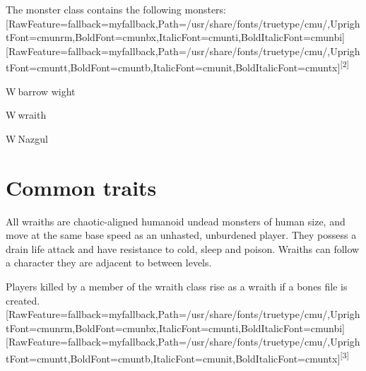 \documentclass[fontsize=11pt,paper=A4,BCOR=12mm,DIV=13,open=any,listof=totoc,toc=flat]{scrbook}
\begin{document}
The monster class contains the following monsters:\allowbreak{}\setmainfont{cmunrm.ttf}[RawFeature={fallback=myfallback},Path=/usr/share/fonts/truetype/cmu/,UprightFont=cmunrm,BoldFont=cmunbx,ItalicFont=cmunti,BoldItalicFont=cmunbi]\setmonofont{cmunrm.ttf}[RawFeature={fallback=myfallback},Path=/usr/share/fonts/truetype/cmu/,UprightFont=cmuntt,BoldFont=cmuntb,ItalicFont=cmunit,BoldItalicFont=cmuntx]\textsuperscript{{$\text{[}$}2{$\text{]}$}}




\begin{myitemize}\item{}W{\mbox{$~$}}barrow wight\footnotemark[5]
\item{}W{\mbox{$~$}}wraith\footnotemark[6]
\item{}W{\mbox{$~$}}Nazgul\footnotemark[7]
\end{myitemize}



\section{Common traits}
\label{1}
All wraiths are chaotic\footnotemark[8]-{}aligned humanoid\footnotemark[9] undead\footnotemark[10] monsters of human size\footnotemark[11], and move at the same base speed\footnotemark[12] as an unhasted, unburdened player. They possess a drain life\footnotemark[13] attack and have resistance to cold\footnotemark[14], sleep\footnotemark[15] and poison\footnotemark[16]. Wraiths can follow\footnotemark[17] a character they are adjacent to between levels.


Players killed by a member of the wraith class rise as a wraith if a bones\footnotemark[18] file is created.\allowbreak{}\setmainfont{cmunrm.ttf}[RawFeature={fallback=myfallback},Path=/usr/share/fonts/truetype/cmu/,UprightFont=cmunrm,BoldFont=cmunbx,ItalicFont=cmunti,BoldItalicFont=cmunbi]\setmonofont{cmunrm.ttf}[RawFeature={fallback=myfallback},Path=/usr/share/fonts/truetype/cmu/,UprightFont=cmuntt,BoldFont=cmuntb,ItalicFont=cmunit,BoldItalicFont=cmuntx]\textsuperscript{{$\text{[}$}3{$\text{]}$}}
\end{document}
